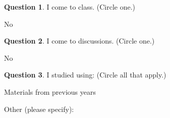 \documentclass[11pt,oneside]{amsart}
\theoremstyle{definition}
\newtheorem{question}{Question}
\theoremstyle{plain}
\begin{document}
\begin{question}
  I come to class. (Circle one.)

  \hspace{1.5cm}\hspace{1.5cm}\hspace{1.5cm} No
\end{question}

\begin{question}
  I come to discussions. (Circle one.)

  \hspace{1.5cm}\hspace{1.5cm} No
\end{question}

\begin{question}
  I studied using: (Circle all that apply.)

  \hspace{1.5cm}\hspace{0.05\textwidth} \hspace{0.05\textwidth} Materials from previous years

  \hspace{1.5cm}Other (please specify): \underline{\hspace{8cm}}
\end{question}

\newpage
\end{document}
